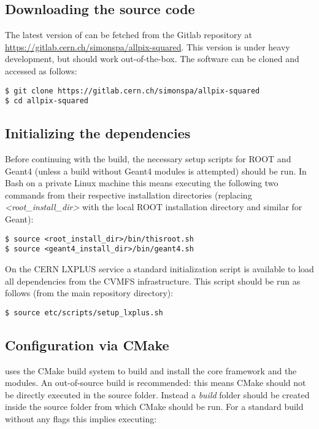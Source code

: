 \subsection{Downloading the source code}
The latest version of \apsq can be fetched from the Gitlab repository at \url{https://gitlab.cern.ch/simonspa/allpix-squared}. This version is under heavy development, but should work out-of-the-box. The software can be cloned and accessed as follows:

\begin{verbatim}
$ git clone https://gitlab.cern.ch/simonspa/allpix-squared
$ cd allpix-squared
\end{verbatim}

\subsection{Initializing the dependencies}
\label{sec:initialize_dependencies}
Before continuing with the build, the necessary setup scripts for ROOT and Geant4 (unless a build without Geant4 modules is attempted) should be run. In Bash on a private Linux machine this means executing the following two commands from their respective installation directories (replacing \textit{\textless root\_install\_dir\textgreater} with the local ROOT installation directory and similar for Geant):
\begin{verbatim}
$ source <root_install_dir>/bin/thisroot.sh
$ source <geant4_install_dir>/bin/geant4.sh
\end{verbatim}

On the CERN LXPLUS service a standard initialization script is available to load all dependencies from the CVMFS infrastructure. This script should be run as follows (from the main repository directory):
\begin{verbatim}
$ source etc/scripts/setup_lxplus.sh
\end{verbatim}

\subsection{Configuration via CMake}
\label{sec:cmake_config}
\apsq uses the CMake build system to build and install the core framework and the modules. An out-of-source build is recommended: this means CMake should not be directly executed in the source folder. Instead a \textit{build} folder should be created inside the source folder from which CMake should be run. For a standard build without any flags this implies executing:

